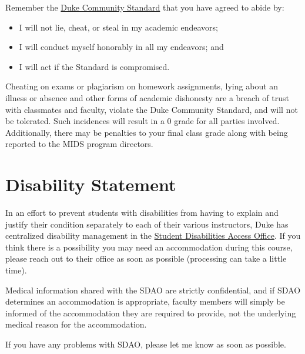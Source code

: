 \documentclass[12pt]{article}
\begin{document}
Remember the \href{https://studentaffairs.duke.edu/conduct/about-us/duke-community-standard}{Duke Community Standard} that you have agreed to abide by:

\begin{itemize}
	\item I will not lie, cheat, or steal in my academic endeavors;
	\item I will conduct myself honorably in all my endeavors; and
	\item I will act if the Standard is compromised.
\end{itemize}

Cheating on exams or plagiarism on homework assignments, lying about an illness or absence and other forms of academic dishonesty are a breach of trust with classmates and faculty, violate the Duke Community Standard, and will not be tolerated. Such incidences will result in a 0 grade for all parties involved. Additionally, there may be penalties to your final class grade along with being reported to the MIDS program directors.

\section{Disability Statement}

In an effort to prevent students with disabilities from having to explain and justify their condition separately to each of their various instructors, Duke has centralized disability management in the \href{https://access.duke.edu/students}{Student Disabilities Access Office}. If you think there is a possibility you may need an accommodation during this course, please reach out to their office as soon as possible (processing can take a little time).

Medical information shared with the SDAO are strictly confidential, and if SDAO determines an accommodation is appropriate, faculty members will simply be informed of the accommodation they are required to provide, not the underlying medical reason for the accommodation.

If you have any problems with SDAO, please let me know as soon as possible.
\end{document}
